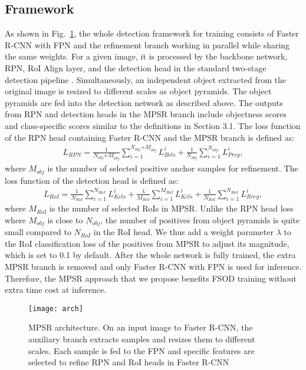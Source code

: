 \documentclass[runningheads]{llncs}
\begin{document}
\subsection{Framework}
As shown in Fig.~\ref{fig:arch}, the whole detection framework for training consists of Faster R-CNN with FPN and the refinement branch working in parallel while sharing the same weights.
For a given image, it is processed by the backbone network, RPN, RoI Align layer, and the detection head in the standard two-stage detection pipeline \cite{fasterrcnn}. 
Simultaneously, an independent object extracted from the original image is resized to different scales as object pyramids. 
The object pyramids are fed into the detection network as described above. 
The outputs from RPN and detection heads in the MPSR branch include objectness scores and class-specific scores similar to the definitions in Section 3.1.
The loss function of the RPN head containing Faster R-CNN and the MPSR branch is defined as:
\begin{align}
L_{RPN} = \frac{1}{N_{obj}{+ M}_{obj}}{\sum_{i = 1}^{N_{obj}{+ M}_{obj}}L_{Bcls}^{i}} + \frac{1}{N_{obj}}{\sum_{i = 1}^{N_{obj}}L_{Preg}^{i}},
\end{align}
where $M_{obj}$ is the number of selected positive anchor samples for refinement. The loss function of the detection head is defined as:
\begin{align}
L_{RoI} = \frac{1}{N_{RoI}}{\sum_{i = 1}^{N_{RoI}}L_{Kcls}^{i}} + \frac{\lambda}{M_{RoI}}{\sum_{i = 1}^{M_{RoI}}L_{Kcls}^{i}} + \frac{1}{N_{RoI}}{\sum_{i = 1}^{N_{RoI}}L_{Rreg}^{i}},
\end{align}
where $M_{RoI}$ is the number of selected RoIs in MPSR. 
Unlike the RPN head loss where $M_{obj}$ is close to $N_{obj}$, the number of positives from object pyramids is quite small compared to $N_{RoI}$ in the RoI head.
We thus add a weight parameter $\lambda$ to the RoI classification loss of the positives from MPSR to adjust its magnitude, which is set to 0.1 by default.
After the whole network is fully trained, the extra MPSR branch is removed and only Faster R-CNN with FPN is used for inference. 
Therefore, the MPSR approach that we propose benefits FSOD training without extra time cost at inference.
\begin{figure}
	\centering
	\texttt{[image: arch]}
	\caption{MPSR architecture. On an input image to Faster R-CNN, the auxiliary branch extracts samples and resizes them to different scales. Each sample is fed to the FPN and specific features are selected to refine RPN and RoI heads in Faster R-CNN}
	\label{fig:arch}
\end{figure} 
\end{document}
